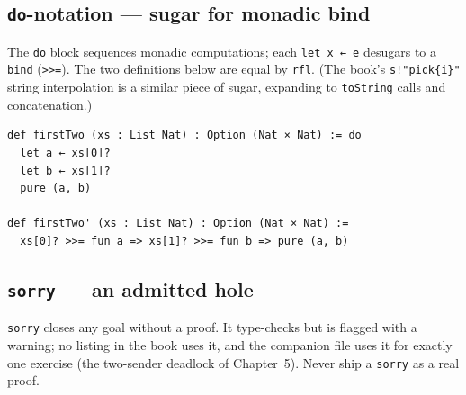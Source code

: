 \documentclass[11pt, a4paper, oneside]{book}
\newcommand{\lc}[1]{\texttt{#1}}
\newcounter{exercise}[chapter]
\begin{document}
\subsection*{\lc{do}-notation --- sugar for monadic bind}

The \lc{do} block sequences monadic computations; each \lc{let x ← e}
desugars to a \lc{bind} (\lc{>>=}). The two definitions below are equal by
\lc{rfl}. (The book's \lc{s!"pick\{i\}"} string interpolation is a similar piece
of sugar, expanding to \lc{toString} calls and concatenation.)

\begin{leanbox}
\begin{verbatim}
def firstTwo (xs : List Nat) : Option (Nat × Nat) := do
  let a ← xs[0]?
  let b ← xs[1]?
  pure (a, b)

def firstTwo' (xs : List Nat) : Option (Nat × Nat) :=
  xs[0]? >>= fun a => xs[1]? >>= fun b => pure (a, b)
\end{verbatim}
\end{leanbox}

\subsection*{\lc{sorry} --- an admitted hole}

\lc{sorry} closes any goal without a proof. It type-checks but is flagged with a
warning; no listing in the book uses it, and the companion file uses it for
exactly one exercise (the two-sender deadlock of Chapter~5). Never ship a \lc{sorry} as a real proof.
\end{document}

